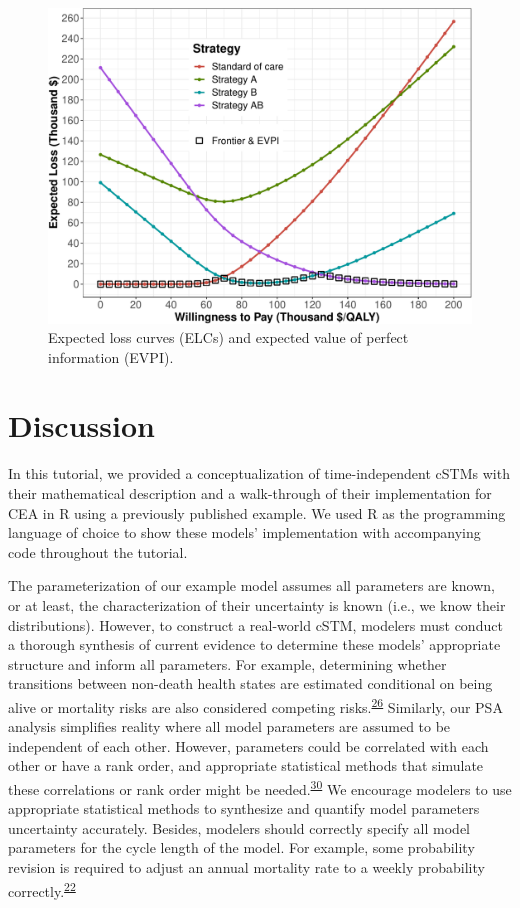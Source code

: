 \documentclass[
]{article}
\begin{document}
\begin{figure}[H]

{\centering \includegraphics{figs/ELC-1} 

}

\caption{Expected loss curves (ELCs) and expected value of perfect information (EVPI).}\label{fig:ELC}
\end{figure}

\hypertarget{discussion}{%
\section{Discussion}\label{discussion}}

In this tutorial, we provided a conceptualization of time-independent cSTMs with their mathematical description and a walk-through of their implementation for CEA in R using a previously published example. We used R as the programming language of choice to show these models' implementation with accompanying code throughout the tutorial.

The parameterization of our example model assumes all parameters are known, or at least, the characterization of their uncertainty is known (i.e., we know their distributions). However, to construct a real-world cSTM, modelers must conduct a thorough synthesis of current evidence to determine these models' appropriate structure and inform all parameters. For example, determining whether transitions between non-death health states are estimated conditional on being alive or mortality risks are also considered competing risks.\textsuperscript{\protect\hyperlink{ref-Briggs2012}{26}} Similarly, our PSA analysis simplifies reality where all model parameters are assumed to be independent of each other. However, parameters could be correlated with each other or have a rank order, and appropriate statistical methods that simulate these correlations or rank order might be needed.\textsuperscript{\protect\hyperlink{ref-Goldhaber-Fiebert2015}{30}} We encourage modelers to use appropriate statistical methods to synthesize and quantify model parameters uncertainty accurately. Besides, modelers should correctly specify all model parameters for the cycle length of the model. For example, some probability revision is required to adjust an annual mortality rate to a weekly probability correctly.\textsuperscript{\protect\hyperlink{ref-Hunink2014}{22}}
\end{document}
